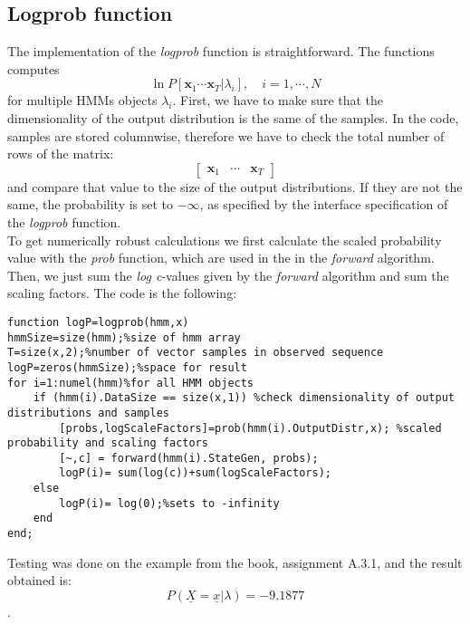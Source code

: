 \subsection{Logprob function}
The implementation of the \textit{logprob} function is straightforward.  The functions computes
$$\ln P[\mathbf{x}_1 \cdots \mathbf{x}_T | \lambda_i],\quad i=1,\cdots,N$$
for multiple HMMs objects $\lambda_i$. First, we have to make sure that the dimensionality of the output distribution is the same of the samples. In the code, samples are stored columnwise, therefore we have to check the total number of rows of the matrix:
$$ \begin{bmatrix}
\mathbf{x}_1 & \cdots & \mathbf{x}_T
\end{bmatrix}
$$
and compare that value to the size of the output distributions. If they are not the same, the probability is set to $-\infty$, as specified by the interface specification of the \textit{logprob} function.\\
To get numerically robust calculations we first calculate the scaled probability value with the \textit{prob} function, which are used in the in the \textit{forward} algorithm. Then, we just sum the \textit{log c}-values given by the \textit{forward} algorithm and sum the scaling factors. The code is the following:
\begin{lstlisting}
function logP=logprob(hmm,x)
hmmSize=size(hmm);%size of hmm array
T=size(x,2);%number of vector samples in observed sequence
logP=zeros(hmmSize);%space for result
for i=1:numel(hmm)%for all HMM objects
	if (hmm(i).DataSize == size(x,1)) %check dimensionality of output distributions and samples
		[probs,logScaleFactors]=prob(hmm(i).OutputDistr,x); %scaled probability and scaling factors
		[~,c] = forward(hmm(i).StateGen, probs);
		logP(i)= sum(log(c))+sum(logScaleFactors);
	else
		logP(i)= log(0);%sets to -infinity
	end
end;
\end{lstlisting}
Testing was done on the example from the book, assignment A.3.1, and the result obtained is: $$P(\underline{X}=\underline{x}|\lambda) = -9.1877$$.

